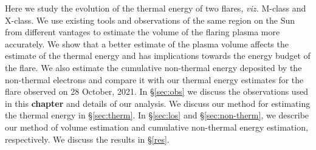 Here we study the evolution of the thermal energy of two flares, \textit{viz.} M-class and X-class. We use existing tools and observations of the same region on the Sun from different vantages to estimate the volume of the flaring plasma more accurately. We show that a better estimate of the plasma volume affects the estimate of the thermal energy and has implications towards the energy budget of the flare. We also estimate the cumulative non-thermal energy deposited by the non-thermal electrons and compare it with our thermal energy estimates for the flare observed on 28 October, 2021. In \S\ref{sec:obs} we discuss the observations used in this {\bf chapter} and details of our analysis. We discuss our method for estimating the thermal energy in \S\ref{sec:therm}. In \S\ref{sec:los} and \S\ref{sec:non-therm}, we describe our method of volume estimation and cumulative non-thermal energy estimation, respectively. We discuss the results in \S\ref{res}.


